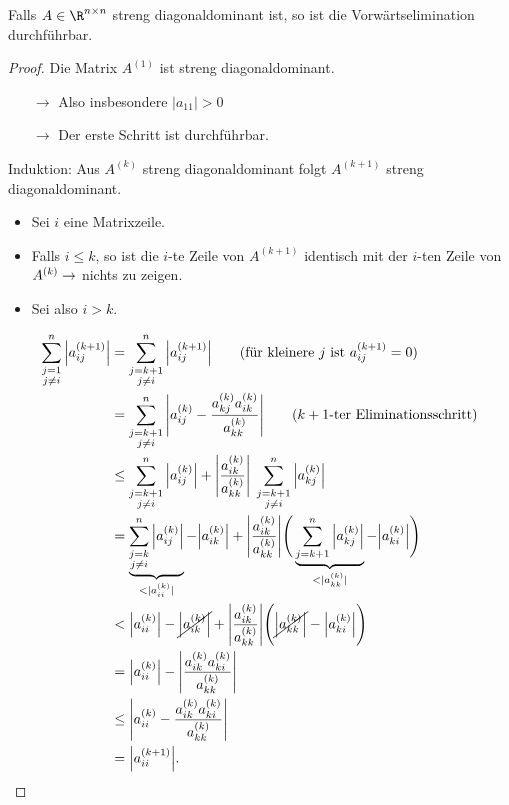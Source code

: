 \begin{lemma}
Falls $A \in \R^{n \times n}$ streng diagonaldominant ist, so ist die Vorwärtselimination durchführbar.
\end{lemma}
\begin{proof}
Die Matrix $A^{(1)}$ ist streng diagonaldominant.
\begin{itemize}
\item[$\rightarrow$] Also insbesondere $\vert a_{11} \vert > 0$
\item[$\rightarrow$] Der erste Schritt ist durchführbar.
\end{itemize}
Induktion: Aus $A^{(k)}$ streng diagonaldominant folgt $A^{(k+1)}$ streng diagonaldominant.
\begin{itemize}
\item Sei $i$ eine Matrixzeile.
\item Falls $i \le k$, so ist die $i$-te Zeile  von $A^{(k+1)}$ identisch mit der $i$-ten Zeile von $A^{(k)} \\
   \rightarrow$ nichts zu zeigen.
\item Sei also $i > k$.
\end{itemize}
\begin{align*}
\sum_{\substack{j = 1 \\ j \neq i}}^{n} \Big\vert a_{ij}^{(k+1)}\Big\vert & = \sum_{\substack{j = k+1 \\ j \neq i}}^{n} \Big\vert a_{ij}^{(k+1)}\Big\vert
\qquad \text{(für kleinere $j$ ist $a_{ij}^{(k+1)} = 0$)} \\
%
& =
\sum_{\substack{j = k+1 \\ j \neq i}}^{n}  \Bigg\vert a_{ij}^{(k)} - \frac{a_{kj}^{(k)}a_{ik}^{(k)}}{a_{kk}^{(k)}}\Bigg\vert
\qquad
\text{($k+1$-ter Eliminationsschritt)} \\
%
& \le
\sum_{\substack{j = k+1 \\ j \neq i}}^{n} \Big\vert a_{ij}^{(k)} \Big\vert + \Bigg\vert \frac{a_{ik}^{(k)}}{a_{kk}^{(k)}}\Bigg\vert \;\sum_{\substack{j = k+1 \\ j \neq i}}^{n} \Big\vert a_{kj}^{(k)} \Big\vert \\
%
& = \underbrace{\sum_{\substack{j = k \\ j \neq i}}^{n} \Big\vert a_{ij}^{(k)} \Big\vert}_{< \vert a_{ii}^{(k)} \vert}
- \Big\vert a_{ik}^{(k)} \Big\vert
  +
  \Bigg\vert \frac{a_{ik}^{(k)}}{a_{kk}^{(k)}} \Bigg\vert
  \Bigg(\underbrace{\sum_{j = k+1}^{n} \Big\vert a_{kj}^{(k)} \Big\vert}_{< \vert a_{kk}^{(k)} \vert}
-\Big\vert a_{ki}^{(k)} \Big\vert \Bigg)
\\ & < \Big \vert a_{ii}^{(k)} \Big\vert - \cancel{\Big \vert a_{ik}^{(k)} \Big\vert} + \Bigg\vert \frac{a_{ik}^{(k)}}{a_{kk}^{(k)}}\Bigg\vert \Bigg(\cancel{\Big\vert a_{kk}^{(k)} \Big\vert}
-\Big\vert a_{ki}^{(k)} \Big\vert \Bigg)
\\ & = \Big \vert a_{ii}^{(k)} \Big\vert - \Bigg\vert \frac{a_{ik}^{(k)} a_{ki}^{(k)}}{a_{kk}^{(k)}}\Bigg\vert
\\ & \le \Bigg\vert a_{ii}^{(k)} - \frac{a_{ik}^{(k)} a_{ki}^{(k)}}{a_{kk}^{(k)}}\Bigg\vert
\\ & = \Big\vert a_{ii}^{(k+1)}\Big\vert.
\qedhere
\end{align*}
\end{proof}
